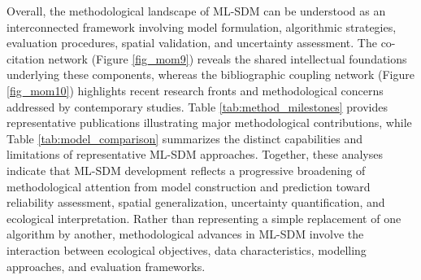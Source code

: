 \documentclass[authoryear,preprint,review,12pt]{elsarticle}
\begin{document}
Overall, the methodological landscape of ML-SDM can be understood as an interconnected framework involving model formulation, algorithmic strategies, evaluation procedures, spatial validation, and uncertainty assessment. The co-citation network (Figure \ref{fig_mom9}) reveals the shared intellectual foundations underlying these components, whereas the bibliographic coupling network (Figure \ref{fig_mom10}) highlights recent research fronts and methodological concerns addressed by contemporary studies. Table \ref{tab:method_milestones} provides representative publications illustrating major methodological contributions, while Table \ref{tab:model_comparison} summarizes the distinct capabilities and limitations of representative ML-SDM approaches. Together, these analyses indicate that ML-SDM development reflects a progressive broadening of methodological attention from model construction and prediction toward reliability assessment, spatial generalization, uncertainty quantification, and ecological interpretation. Rather than representing a simple replacement of one algorithm by another, methodological advances in ML-SDM involve the interaction between ecological objectives, data characteristics, modelling approaches, and evaluation frameworks.


\begingroup
\footnotesize
\renewcommand{\arraystretch}{1.2}
\setlength{\tabcolsep}{4pt}
\setlength{\LTleft}{0pt}
\setlength{\LTright}{0pt}
\setlength{\LTcapwidth}{\textwidth}
\end{document}
